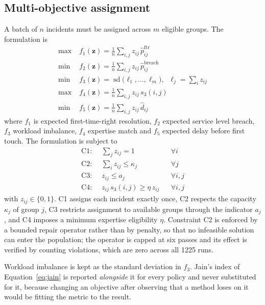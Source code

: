\subsection{Multi-objective assignment}
\label{sec:moo}

A batch of $n$ incidents must be assigned across $m$ eligible groups. The formulation is
\begin{align}
\max\; & f_1(\mathbf{z}) = \tfrac{1}{n}\textstyle\sum_{i,j} z_{ij}\, \hat{p}^{\mathrm{ftr}}_{ij}
  \label{eq:f1obj}\\
\min\; & f_2(\mathbf{z}) = \tfrac{1}{n}\textstyle\sum_{i,j} z_{ij}\, \hat{p}^{\mathrm{breach}}_{ij}
  \label{eq:f2obj}\\
\min\; & f_3(\mathbf{z}) = \operatorname{sd}\bigl(\ell_1,\dots,\ell_m\bigr),
  \;\; \ell_j = \textstyle\sum_i z_{ij} \label{eq:f3obj}\\
\max\; & f_4(\mathbf{z}) = \tfrac{1}{n}\textstyle\sum_{i,j} z_{ij}\, s_3(i,j)
  \label{eq:f4obj}\\
\min\; & f_5(\mathbf{z}) = \tfrac{1}{n}\textstyle\sum_{i,j} z_{ij}\, \hat{d}_{ij}
  \label{eq:f5obj}
\end{align}
where $f_1$ is expected first-time-right resolution, $f_2$ expected service level breach, $f_3$
workload imbalance, $f_4$ expertise match and $f_5$ expected delay before first touch. The
formulation is subject to
\begin{align}
\text{C1:}\;\; & \textstyle\sum_{j} z_{ij} = 1 && \forall i \label{eq:c1}\\
\text{C2:}\;\; & \textstyle\sum_{i} z_{ij} \le \kappa_j && \forall j \label{eq:c2}\\
\text{C3:}\;\; & z_{ij} \le a_j && \forall i,j \label{eq:c3}\\
\text{C4:}\;\; & z_{ij} \, s_3(i,j) \ge \eta \, z_{ij} && \forall i,j \label{eq:c4}
\end{align}
with $z_{ij}\in\{0,1\}$. C1 assigns each incident exactly once, C2 respects the capacity
$\kappa_j$ of group $j$, C3 restricts assignment to available groups through the indicator
$a_j$, and C4 imposes a minimum expertise eligibility $\eta$. Constraint C2 is enforced by a bounded repair operator rather than by
penalty, so that no infeasible solution can enter the population; the operator is capped at six
passes and its effect is verified by counting violations, which are zero across all
\num{1225} runs.

Workload imbalance is kept as the standard deviation in $f_3$. Jain's index of
Equation~\ref{eq:jain} is reported \emph{alongside} it for every policy and never substituted
for it, because changing an objective after observing that a method loses on it would be
fitting the metric to the result.

